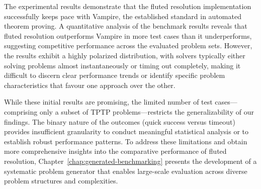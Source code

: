 The experimental results demonstrate that the fluted resolution implementation successfully keeps pace with Vampire, the established standard in automated theorem proving.
A quantitative analysis of the benchmark results reveals that fluted resolution outperforms Vampire in more test cases than it underperforms, suggesting competitive performance across the evaluated problem sets.
However, the results exhibit a highly polarized distribution, with solvers typically either solving problems almost instantaneously or timing out completely, making it difficult to discern clear performance trends or identify specific problem characteristics that favour one approach over the other.

While these initial results are promising, the limited number of test cases—comprising only a subset of TPTP problems—restricts the generalizability of our findings.
The binary nature of the outcomes (quick success versus timeout) provides insufficient granularity to conduct meaningful statistical analysis or to establish robust performance patterns.
To address these limitations and obtain more comprehensive insights into the comparative performance of fluted resolution, Chapter~\ref{chap:generated-benchmarking} presents the development of a systematic problem generator that enables large-scale evaluation across diverse problem structures and complexities.
